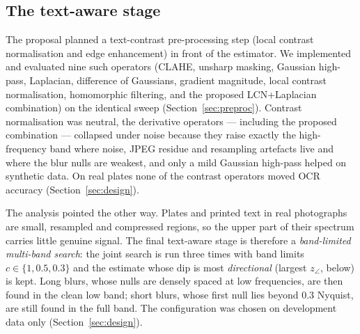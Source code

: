 \subsection{The text-aware stage}
\label{sec:textaware}
The proposal planned a text-contrast pre-processing step (local contrast normalisation and
edge enhancement) in front of the estimator. We implemented and evaluated nine such operators
(CLAHE, unsharp masking, Gaussian high-pass, Laplacian, difference of Gaussians, gradient
magnitude, local contrast normalisation, homomorphic filtering, and the proposed
LCN+Laplacian combination) on the identical sweep (Section~\ref{sec:preproc}). Contrast
normalisation was neutral, the derivative operators --- including the proposed combination ---
collapsed under noise because they raise exactly the high-frequency band where noise, JPEG residue
and resampling artefacts live and where the blur nulls are weakest, and only a mild Gaussian
high-pass helped on synthetic data. On real plates none of the contrast operators moved OCR
accuracy (Section~\ref{sec:design}).

The analysis pointed the other way. Plates and printed text in real photographs are small,
resampled and compressed regions, so the upper part of their spectrum carries little genuine
signal. The final text-aware stage is therefore a \emph{band-limited multi-band search}: the joint
search is run three times with band limits $c\in\{1, 0.5, 0.3\}$ and the estimate whose dip is
most \emph{directional} (largest $z_\angle$, below) is kept. Long blurs, whose nulls are densely
spaced at low frequencies, are then found in the clean low band; short blurs, whose first null
lies beyond $0.3$ Nyquist, are still found in the full band. The configuration was chosen on
development data only (Section~\ref{sec:design}).

